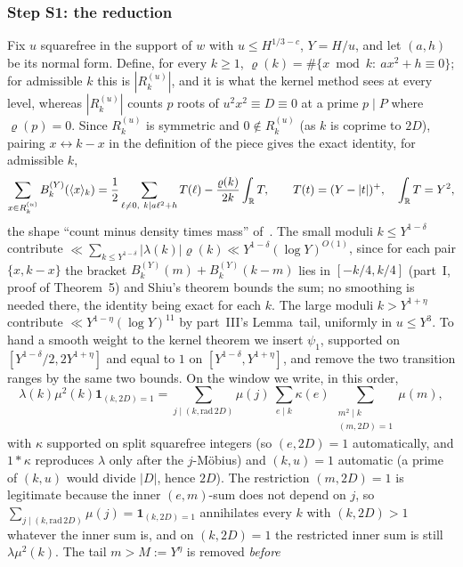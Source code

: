 \documentclass[11pt,a4paper]{article}
\begin{document}
\subsubsection*{Step S1: the reduction}
Fix $u$ squarefree in the support of $w$ with $u\le H^{1/3-c}$, $Y=H/u$, and let $(a,h)$ be its normal form. Define, for every $k\ge1$, $\varrho(k)=\#\{x\bmod k:\ ax^2+h\equiv0\}$;
for admissible $k$ this is $|R^{(u)}_k|$, and it is what the kernel method sees at every level, whereas $|R^{(u)}_k|$ counts $p$ roots of $u^2x^2\equiv D\equiv0$ at a prime $p\mid P$
where $\varrho(p)=0$. Since $R^{(u)}_k$ is symmetric and $0\notin R^{(u)}_k$ (as $k$ is coprime to $2D$), pairing $x\leftrightarrow k-x$ in the definition of the piece gives the exact
identity, for admissible $k$,
\begin{equation}\label{eq:S1}
\sum_{x\in R^{(u)}_k}B^{(Y)}_k(\langle x\rangle_k)=\frac12\sum_{\ell\ne0,\ k\mid a\ell^2+h}T(\ell)-\frac{\varrho(k)}{2k}\int_{\mathbb{R}} T,\qquad T(t)=(Y-|t|)^+,\quad\int_{\mathbb{R}} T=Y^2,
\end{equation}
the shape ``count minus density times mass'' of~\cite{GrimmeltMerikoski2025quadratic}. The small moduli $k\le Y^{1-\delta}$ contribute $\ll\sum_{k\le Y^{1-\delta}}|\lambda(k)|\varrho(k)\ll Y^{1-\delta}(\log Y)^{O(1)}$,
since for each pair $\{x,k-x\}$ the bracket $B^{(Y)}_k(m)+B^{(Y)}_k(k-m)$ lies in $[-k/4,k/4]$ (part~I, proof of Theorem~5) and Shiu's theorem bounds the sum; no smoothing is needed there,
the identity being exact for each $k$. The large moduli $k>Y^{1+\eta}$ contribute $\ll Y^{1-\eta}(\log Y)^{11}$ by part~III's Lemma~tail, uniformly in $u\le Y^3$. To hand a smooth
weight to the kernel theorem we insert $\psi_1$, supported on $[Y^{1-\delta}/2,2Y^{1+\eta}]$ and equal to $1$ on $[Y^{1-\delta},Y^{1+\eta}]$, and remove the two transition ranges by the
same two bounds. On the window we write, in this order,
\[
\lambda(k)\mu^2(k)\mathbf 1_{(k,2D)=1}=\sum_{j\mid(k,\mathrm{rad}\,2D)}\mu(j)\ \sum_{e\mid k}\kappa(e)\ \sum_{\substack{m^2\mid k\\(m,2D)=1}}\mu(m),
\]
with $\kappa$ supported on split squarefree integers (so $(e,2D)=1$ automatically, and $1*\kappa$ reproduces $\lambda$ only after the $j$-M\"obius) and $(k,u)=1$ automatic (a prime
of $(k,u)$ would divide $|D|$, hence $2D$). The restriction $(m,2D)=1$ is legitimate because the inner $(e,m)$-sum does not depend on $j$, so $\sum_{j\mid(k,\mathrm{rad}\,2D)}\mu(j)=\mathbf 1_{(k,2D)=1}$
annihilates every $k$ with $(k,2D)>1$ whatever the inner sum is, and on $(k,2D)=1$ the restricted inner sum is still $\lambda\mu^2(k)$. The tail $m>M:=Y^{\eta}$ is removed \emph{before}
\end{document}
